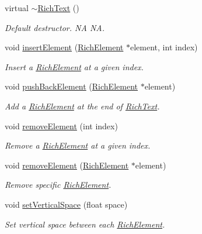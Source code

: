 \begin{DoxyCompactItemize}
\mbox{\label{classui_1_1RichText_a9b2396845c063571d51d755b7942b891}} 
virtual \hyperlink{classui_1_1RichText_a9b2396845c063571d51d755b7942b891}{$\sim$\+Rich\+Text} ()
\begin{DoxyCompactList}\small\item\em Default destructor.  NA  NA. \end{DoxyCompactList}\item 
void \hyperlink{classui_1_1RichText_a7275315b5e730c96a4e9b39e18c2cb9e}{insert\+Element} (\hyperlink{classui_1_1RichElement}{Rich\+Element} $\ast$element, int index)
\begin{DoxyCompactList}\small\item\em Insert a \hyperlink{classui_1_1RichElement}{Rich\+Element} at a given index. \end{DoxyCompactList}\item 
void \hyperlink{classui_1_1RichText_a9d9c7e5a460fec33d81de7811deb44ca}{push\+Back\+Element} (\hyperlink{classui_1_1RichElement}{Rich\+Element} $\ast$element)
\begin{DoxyCompactList}\small\item\em Add a \hyperlink{classui_1_1RichElement}{Rich\+Element} at the end of \hyperlink{classui_1_1RichText}{Rich\+Text}. \end{DoxyCompactList}\item 
void \hyperlink{classui_1_1RichText_a5943a34f2a067b8f40e21ee0678732a4}{remove\+Element} (int index)
\begin{DoxyCompactList}\small\item\em Remove a \hyperlink{classui_1_1RichElement}{Rich\+Element} at a given index. \end{DoxyCompactList}\item 
void \hyperlink{classui_1_1RichText_ae17d3860bef08a3a61992e228bd6c483}{remove\+Element} (\hyperlink{classui_1_1RichElement}{Rich\+Element} $\ast$element)
\begin{DoxyCompactList}\small\item\em Remove specific \hyperlink{classui_1_1RichElement}{Rich\+Element}. \end{DoxyCompactList}\item 
void \hyperlink{classui_1_1RichText_a73876d64898fdce17df00e74a1d68864}{set\+Vertical\+Space} (float space)
\begin{DoxyCompactList}\small\item\em Set vertical space between each \hyperlink{classui_1_1RichElement}{Rich\+Element}. \end{DoxyCompactList}\item 

\end{DoxyCompactItemize}
